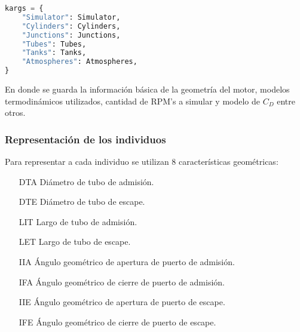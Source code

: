 \begin{lstlisting}[language=Python]
kargs = {
    "Simulator": Simulator,
    "Cylinders": Cylinders,
    "Junctions": Junctions,
    "Tubes": Tubes,
    "Tanks": Tanks,
    "Atmospheres": Atmospheres,
}
\end{lstlisting}

En donde se guarda la información básica de la geometría del motor, modelos
termodinámicos utilizados, cantidad de RPM's a simular y modelo de $C_D$ entre
otros.



%
\subsubsection{Representación de los individuos}
%
Para representar a cada individuo se utilizan 8 características geométricas:

\begin{enumerate}
    \item [DTA] Diámetro de tubo de admisión.
    \item [DTE] Diámetro de tubo de escape.
    \item [LIT] Largo de tubo de admisión.
    \item [LET] Largo de tubo de escape.
    \item [IIA] Ángulo geométrico de apertura de puerto de admisión.
    \item [IFA] Ángulo geométrico de cierre de puerto de admisión.
    \item [IIE] Ángulo geométrico de apertura de puerto de escape.
    \item [IFE] Ángulo geométrico de cierre de puerto de escape.
\end{enumerate}



